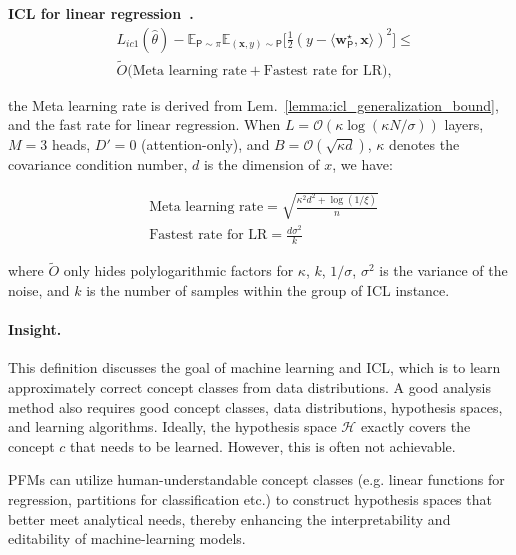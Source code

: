 \begin{lemma}
\textbf{ICL for linear regression~\cite{bai2024transformers}.} 
\begin{equation}
    \begin{aligned}
     & L_{ic1}(\hat{\theta}) - \mathbb{E}_{\mathsf{P}\sim\pi}\mathbb{E}_{(\mathbf{x},y)\sim\mathsf{P}}\bigg[\frac{1}{2}(y-\langle\mathbf{w}^{\star}_{\mathsf{P}},\mathbf{x}\rangle)^{2}\bigg] \leq \\
     & \widetilde{O}\Bigg(\text{Meta learning rate}+\text{Fastest rate for LR}\Bigg),
    \end{aligned}
\end{equation}

the Meta learning rate is derived from Lem.~\ref{lemma:icl_generalization_bound}, and the fast rate for linear regression. When $L = \mathcal{O}(\kappa \log(\kappa N / \sigma))$ layers, $M = 3$ heads, $D' = 0$ (attention-only), and $B = \mathcal{O}(\sqrt{\kappa d})$, $\kappa$ denotes the covariance condition number, $d$ is the dimension of $x$, we have:

\begin{equation}
    \begin{aligned}
        & \text{Meta learning rate} = \sqrt{\frac{\kappa^2 d^2 + \log(1/\xi)}{n}}\ \\
        & \text{Fastest rate for LR} = \frac {d\sigma^2} {k}
    \end{aligned} 
\end{equation}

where $\widetilde{O}$ only hides polylogarithmic factors for $\kappa$, $k$, $1/\sigma$, $\sigma^2$ is the variance of the noise, and $k$ is the number of samples within the group of ICL instance.

\end{lemma}

  
  \paragraph{Insight.} This definition discusses the goal of machine learning and ICL, which is to learn approximately correct concept classes from data distributions. A good analysis method also requires good concept classes, data distributions, hypothesis spaces, and learning algorithms. Ideally, the hypothesis space $\mathcal{H}$ exactly covers the concept $c$ that needs to be learned. However, this is often not achievable.
  
  
  PFMs can utilize human-understandable concept classes (e.g. linear functions for regression, partitions for classification etc.) to construct hypothesis spaces that better meet analytical needs, thereby enhancing the interpretability and editability of machine-learning models. 
  
